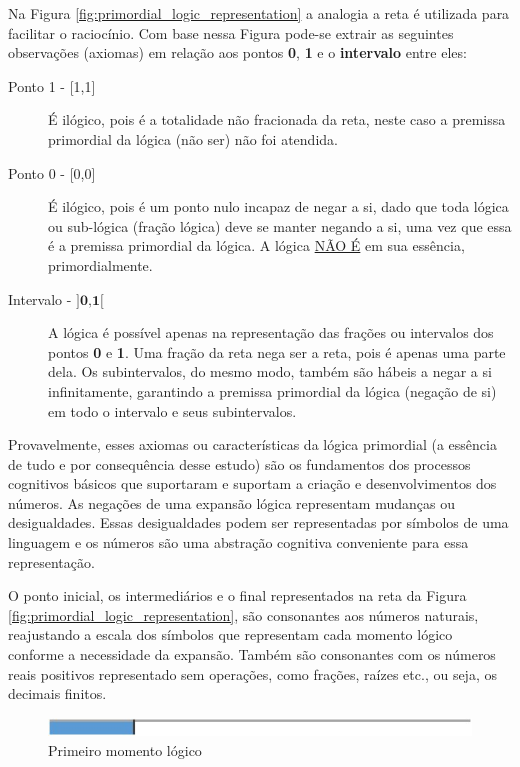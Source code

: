 Na Figura \ref{fig:primordial_logic_representation} a analogia a reta é utilizada para facilitar o raciocínio. Com base nessa Figura pode-se extrair as seguintes observações (axiomas) em relação aos pontos \textbf{0}, \textbf{1} e o \textbf{intervalo} entre eles:
	\begin{description}
	   \item[Ponto 1 - {[1,1]}] É ilógico, pois é a totalidade não fracionada da reta, neste caso a premissa primordial da lógica (não ser) não foi atendida.
	   \item[Ponto 0 - {[0,0]}] É ilógico, pois é um ponto nulo incapaz de negar a si, dado que toda lógica ou sub-lógica (fração lógica) deve se manter negando a si, uma vez que essa é a premissa primordial da lógica. A lógica \underline{NÃO É} em sua essência, primordialmente.
	   \item[Intervalo - $\textbf{{]0,1[}}$] A lógica é possível apenas na representação das frações ou intervalos dos pontos \textbf{0} e \textbf{1}. Uma fração da reta nega ser a reta, pois é apenas uma parte dela. Os subintervalos, do mesmo modo, também são hábeis a negar a si infinitamente, garantindo a premissa primordial da lógica (negação de si) em todo o intervalo e seus subintervalos. 
	\end{description}

Provavelmente, esses axiomas ou características da lógica primordial (a essência de tudo e por consequência desse estudo) são os fundamentos dos processos cognitivos básicos que suportaram e suportam a criação e desenvolvimentos dos números. As negações de uma expansão lógica representam mudanças ou desigualdades. Essas desigualdades podem ser representadas por símbolos de uma linguagem e os números são uma abstração cognitiva conveniente para essa representação. 

O ponto inicial, os intermediários e o final representados na reta da Figura \ref{fig:primordial_logic_representation}, são consonantes aos números naturais, reajustando a escala dos símbolos que representam cada momento lógico conforme a necessidade da expansão. Também são consonantes com os números reais positivos representado sem operações, como frações, raízes etc., ou seja, os decimais finitos.
	\begin{figure}[H]
	\caption{Primeiro momento lógico}
	\label{fig:first_logical_moment}
	\centering
	\includegraphics[scale=1]{sections/images/first_logical_moment.jpg}
	\end{figure}

